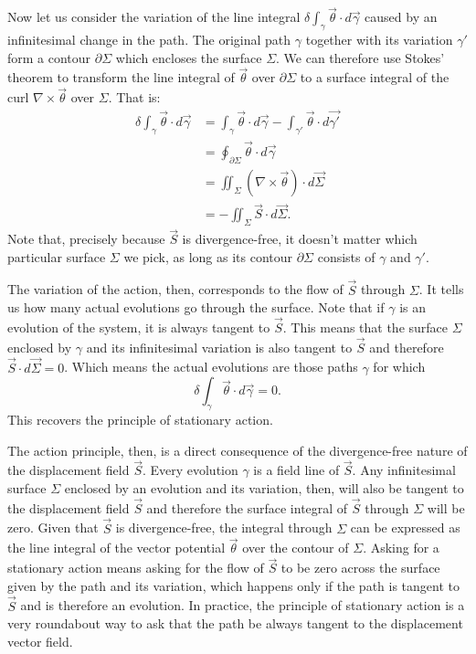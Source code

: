 \documentclass[10pt,twocolumn, nofootinbib]{revtex4-2}
\begin{document}
Now let us consider the variation of the line integral $\delta \int_{\gamma} \vec{\theta} \cdot d\vec{\gamma}$ caused by an infinitesimal change in the path. The original path $\gamma$ together with its variation $\gamma'$ form a contour $\partial \Sigma$ which encloses the surface $\Sigma$. We can therefore use Stokes' theorem to transform the line integral of $\vec{\theta}$ over $\partial \Sigma$ to a surface integral of the curl $\nabla \times \vec{\theta}$ over $\Sigma$. That is:
\begin{align*}
	\delta \int_{\gamma} \vec{\theta} \cdot d\vec{\gamma} 
	&= \int_{\gamma} \vec{\theta} \cdot d\vec{\gamma} - \int_{\gamma'} \vec{\theta} \cdot d\vec{\gamma'} \\
	&= \oint_{\partial \Sigma} \vec{\theta}  \cdot d\vec{\gamma} \\
	&= \iint_{\Sigma} \left( \nabla \times \vec{\theta} \right) \cdot d\vec{\Sigma} \\
	&= - \iint_{\Sigma} \vec{S} \cdot d\vec{\Sigma}.
\end{align*}
Note that, precisely because $\vec{S}$ is divergence-free, it doesn't matter which particular surface $\Sigma$ we pick, as long as its contour $\partial \Sigma$ consists of $\gamma$ and $\gamma'$.

The variation of the action, then, corresponds to the flow of $\vec{S}$ through $\Sigma$. It tells us how many actual evolutions go through the surface. Note that if $\gamma$ is an evolution of the system, it is always tangent to $\vec{S}$. This means that the surface $\Sigma$ enclosed by $\gamma$ and its infinitesimal variation is also tangent to $\vec{S}$ and therefore $\vec{S} \cdot d\vec{\Sigma} = 0$. Which means the actual evolutions are those paths $\gamma$ for which
\begin{equation}
	\delta \int_{\gamma} \vec{\theta} \cdot d\vec{\gamma} = 0.
\end{equation}
This recovers the principle of stationary action.

The action principle, then, is a direct consequence of the divergence-free nature of the displacement field $\vec{S}$. Every evolution $\gamma$ is a field line of $\vec{S}$. Any infinitesimal surface $\Sigma$ enclosed by an evolution and its variation, then, will also be tangent to the displacement field $\vec{S}$ and therefore the surface integral of $\vec{S}$ through $\Sigma$ will be zero. Given that $\vec{S}$ is divergence-free, the integral through $\Sigma$ can be expressed as the line integral of the vector potential $\vec{\theta}$ over the contour of $\Sigma$. Asking for a stationary action means asking for the flow of $\vec{S}$ to be zero across the surface given by the path and its variation, which happens only if the path is tangent to $\vec{S}$ and is therefore an evolution. In practice, the principle of stationary action is a very roundabout way to ask that the path be always tangent to the displacement vector field.
\end{document}
